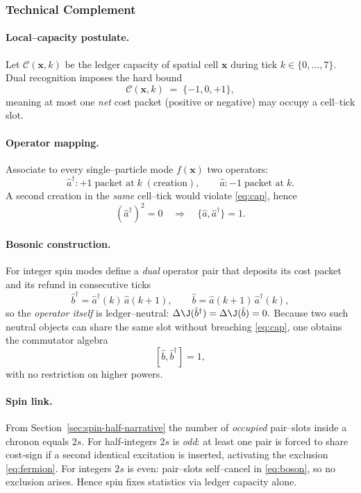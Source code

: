 \documentclass[11pt,oneside]{book}
\begin{document}
\subsubsection*{Technical Complement}

\paragraph{Local–capacity postulate.}
Let $\mathcal{C}(\mathbf x,k)$ be the ledger capacity of spatial cell
$\mathbf x$ during tick $k\!\in\!\{0,\dots,7\}$.
Dual recognition imposes the hard bound
%
\[
   \mathcal{C}(\mathbf x,k)
   \;=\;
   \{-1,0,+1\},
   \tag{S–C.1}\label{eq:cap}
\]
%
meaning at most one \emph{net} cost packet (positive or negative) may
occupy a cell–tick slot.

\paragraph{Operator mapping.}
Associate to every single–particle mode
$f(\mathbf x)$ two operators:
%
\[
   \hat a^{\dagger}\!:
   +1\;\text{packet at}\;k\;( \text{creation}),\qquad
   \hat a\!:
   -1\;\text{packet at}\;k .
\]
%
A second creation in the \emph{same} cell–tick would violate
\eqref{eq:cap}, hence
%
\[
   (\hat a^{\dagger})^{2}=0
   \quad\Longrightarrow\quad
   \{\hat a,\hat a^{\dagger}\}=1 .
   \tag{S–C.2}\label{eq:fermion}
\]

\paragraph{Bosonic construction.}
For integer spin modes define a \emph{dual} operator pair that deposits
its cost packet and its refund in consecutive ticks
%
\[
   \hat b^{\dagger}
   = \hat a^{\dagger}(k)\,\hat a(k+1),
   \qquad
   \hat b
   = \hat a(k+1)\,\hat a^{\dagger}(k),
\]
%
so the \emph{operator itself} is ledger–neutral:
\(
   \Delta\J(\hat b^{\dagger})=\Delta\J(\hat b)=0.
\)
Because two such neutral objects can share the same slot without
breaching \eqref{eq:cap}, one obtains the commutator algebra
%
\[
   [\hat b,\hat b^{\dagger}] = 1 ,
   \tag{S–C.3}\label{eq:boson}
\]
%
with no restriction on higher powers.

\paragraph{Spin link.}
From Section~\ref{sec:spin-half-narrative} the number of \emph{occupied}
pair–slots inside a chronon equals $2s$.  For half-integers
$2s$ is \emph{odd}: at least one pair is forced to share cost‐sign if a
second identical excitation is inserted, activating the
exclusion \eqref{eq:fermion}.  For integers $2s$ is even:
pair–slots self–cancel in \eqref{eq:boson}, so no exclusion arises.
Hence spin fixes statistics via ledger capacity alone.
\end{document}
